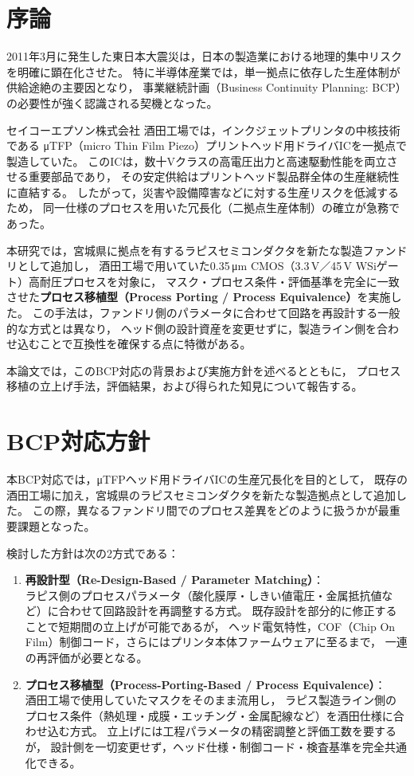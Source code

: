\documentclass[conference]{IEEEtran}
\begin{document}
\section{序論}
2011年3月に発生した東日本大震災は，日本の製造業における地理的集中リスクを明確に顕在化させた。
特に半導体産業では，単一拠点に依存した生産体制が供給途絶の主要因となり，
事業継続計画（Business Continuity Planning: BCP）の必要性が強く認識される契機となった。

セイコーエプソン株式会社 酒田工場では，インクジェットプリンタの中核技術である
μTFP（micro Thin Film Piezo）プリントヘッド用ドライバICを一拠点で製造していた。
このICは，数十Vクラスの高電圧出力と高速駆動性能を両立させる重要部品であり，
その安定供給はプリントヘッド製品群全体の生産継続性に直結する。
したがって，災害や設備障害などに対する生産リスクを低減するため，
同一仕様のプロセスを用いた冗長化（二拠点生産体制）の確立が急務であった。

本研究では，宮城県に拠点を有するラピスセミコンダクタを新たな製造ファンドリとして追加し，
酒田工場で用いていた0.35\,μm CMOS（3.3\,V／45\,V WSiゲート）高耐圧プロセスを対象に，
マスク・プロセス条件・評価基準を完全に一致させた\textbf{プロセス移植型（Process Porting / Process Equivalence）}を実施した。
この手法は，ファンドリ側のパラメータに合わせて回路を再設計する一般的な方式とは異なり，
ヘッド側の設計資産を変更せずに，製造ライン側を合わせ込むことで互換性を確保する点に特徴がある。

本論文では，このBCP対応の背景および実施方針を述べるとともに，
プロセス移植の立上げ手法，評価結果，および得られた知見について報告する。

\section{BCP対応方針}
本BCP対応では，μTFPヘッド用ドライバICの生産冗長化を目的として，
既存の酒田工場に加え，宮城県のラピスセミコンダクタを新たな製造拠点として追加した。
この際，異なるファンドリ間でのプロセス差異をどのように扱うかが最重要課題となった。

検討した方針は次の2方式である：
\begin{enumerate}
\item \textbf{再設計型（Re-Design-Based / Parameter Matching）}：\\
ラピス側のプロセスパラメータ（酸化膜厚・しきい値電圧・金属抵抗値など）に合わせて回路設計を再調整する方式。
既存設計を部分的に修正することで短期間の立上げが可能であるが，
ヘッド電気特性，COF（Chip On Film）制御コード，さらにはプリンタ本体ファームウェアに至るまで，
一連の再評価が必要となる。

\item \textbf{プロセス移植型（Process-Porting-Based / Process Equivalence）}：\\
酒田工場で使用していたマスクをそのまま流用し，
ラピス製造ライン側のプロセス条件（熱処理・成膜・エッチング・金属配線など）を酒田仕様に合わせ込む方式。
立上げには工程パラメータの精密調整と評価工数を要するが，
設計側を一切変更せず，ヘッド仕様・制御コード・検査基準を完全共通化できる。
\end{enumerate}
\end{document}

